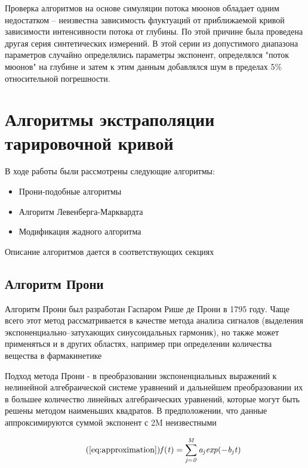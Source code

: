 Проверка алгоритмов на основе симуляции потока мюонов обладает 
одним недостатком -- неизвестна зависимость флуктуаций от приближаемой 
кривой зависимости интенсивности 
потока от глубины. По этой причине была проведена другая серия 
синтетических измерений. В этой серии из допустимого диапазона 
параметров случайно определялись параметры 
экспонент, определялся "поток мюонов" на глубине и затем к этим 
данным добавлялся шум в пределах 5\% относительной погрешности.



\section{Алгоритмы экстраполяции тарировочной кривой}\label{sect2_4}

В ходе работы были рассмотрены следующие алгоритмы:

\begin{itemize}
 \item Прони-подобные алгоритмы
 \item Алгоритм Левенберга-Марквардта
 \item Модификация жадного алгоритма
 
\end{itemize}

Описание алгоритмов дается в соответствующих секциях

\subsection{Алгоритм Прони}\label{subsect2_4_1}

Алгоритм Прони был разработан Гаспаром Рише де Прони в 1795 году. Чаще всего этот метод рассматривается в 
качестве метода анализа сигналов (выделения экспоненциально--затухающих
синусоидальных гармоник), но также может применяться и в других областях, например при определении количества 
вещества в фармакинетике \cite{pharmakinetics}

Подход метода Прони - в преобразовании экспоненциальных выражений к нелинейной алгебраической системе уравнений и 
дальнейшем преобразовании их в большее количество линейных алгебраических уравнений, которые могут быть решены 
методом наименьших квадратов. В предположении, что данные аппроксимируются суммой экспонент с 2M неизвестными

\begin{equation}
  \tag{\ref{eq:approximation}}
  \mathit{ f(t)  = \displaystyle\sum_{j=0}^M a_j exp(-b_j t) }  
\end{equation}

